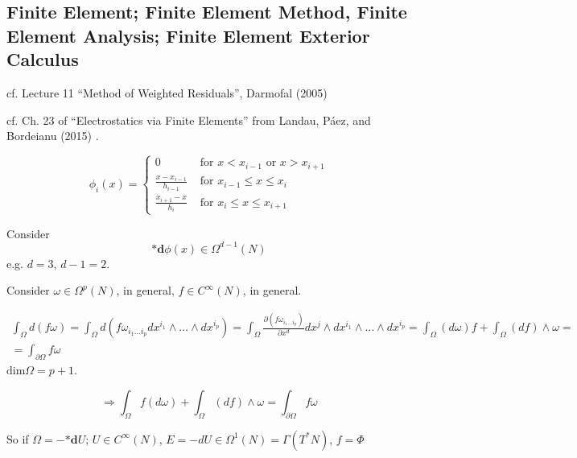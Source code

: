 \documentclass[10pt]{amsart}
\begin{document}
\begin{multicols*}{2}
\part{Finite Element; Finite Element Method, Finite Element Analysis; Finite Element Exterior Calculus}

cf. Lecture 11 ``Method of Weighted Residuals'',  Darmofal (2005) \cite{Darm2005}

cf. Ch. 23 of ``Electrostatics via Finite Elements'' from Landau, P\'{a}ez, and Bordeianu (2015) \cite{LPB2015}.


\begin{equation}
  \phi_i(x) = \begin{cases} 0 & \text{ for } x < x_{i-1} \text{ or } x > x_{i+1} \\
    \frac{x-x_{i-1} }{ h_{i-1}} & \text{ for } x_{i-1} \leq x \leq x_i \\
    \frac{x_{i+1} - x}{h_i } & \text{ for } x_i \leq x\leq x_{i+1} \end{cases}
  \end{equation}


Consider
\[
\mathbf{*} \mathbf{d}\phi(x) \in \Omega^{d-1}(N) 
\]
e.g. $d=3$, $d-1=2$.

Consider $\omega \in \Omega^p(N)$, in general, $f\in C^{\infty}(N)$, in general.

\[
\begin{gathered}
  \int_{\Omega} d(f\omega) = \int_{\Omega} d(f\omega_{i_1 \dots i_p }dx^{i_1} \wedge \dots \wedge dx^{i_p} ) = \int_{\Omega} \frac{ \partial (f\omega_{i_1 \dots i_p } ) }{ \partial x^d} dx^j \wedge dx^{i_1} \wedge \dots \wedge dx^{i_p} = \int_{\Omega} (d\omega ) f + \int_{\Omega} (df) \wedge \omega = \\
  = \int_{ \partial \Omega} f\omega
  \end{gathered}
\]
$\text{dim} \Omega = p+1$.

\begin{equation}
  \Longrightarrow \int_{\Omega} f(d\omega) + \int_{\Omega} (df ) \wedge \omega = \int_{\partial \Omega} f \omega
  \end{equation}

So if $\Omega = - \mathbf{*} \mathbf{d}U$; $U\in C^{\infty}(N)$, $E = -dU \in \Omega^1(N) = \Gamma(T^*N)$, $f=\Phi$


\end{multicols*}
\end{document}
